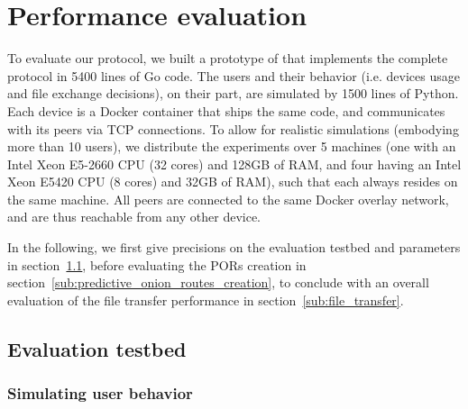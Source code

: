 
\section{Performance evaluation}%
\label{Performance}

To evaluate our protocol, we built a prototype of \name that implements the complete \name protocol in 5400 lines of Go code.
The users and their behavior (i.e. devices usage and file exchange decisions), on their part, are simulated by 1500 lines of Python.
Each device is a Docker container that ships the same \name code, and communicates with its peers via TCP connections.
To allow for realistic simulations (embodying more than 10 users), we distribute the experiments over 5 machines (one with an Intel Xeon E5-2660 CPU (32 cores) and 128GB of RAM, and four having an Intel Xeon E5420 CPU (8 cores) and 32GB of RAM), such that each \squad always resides on the same machine.
All peers are connected to the same Docker overlay network, and are thus reachable from any other device.

In the following, we first give precisions on the evaluation testbed and parameters in section~\ref{sub:evaluation_testbed}, before evaluating the PORs creation in section~\ref{sub:predictive_onion_routes_creation}, to conclude with an overall evaluation of the file transfer performance in section~\ref{sub:file_transfer}.

\subsection{Evaluation testbed} %
\label{sub:evaluation_testbed}

\subsubsection{Simulating user behavior} %
\label{ssub:simulating_user_behavior}

